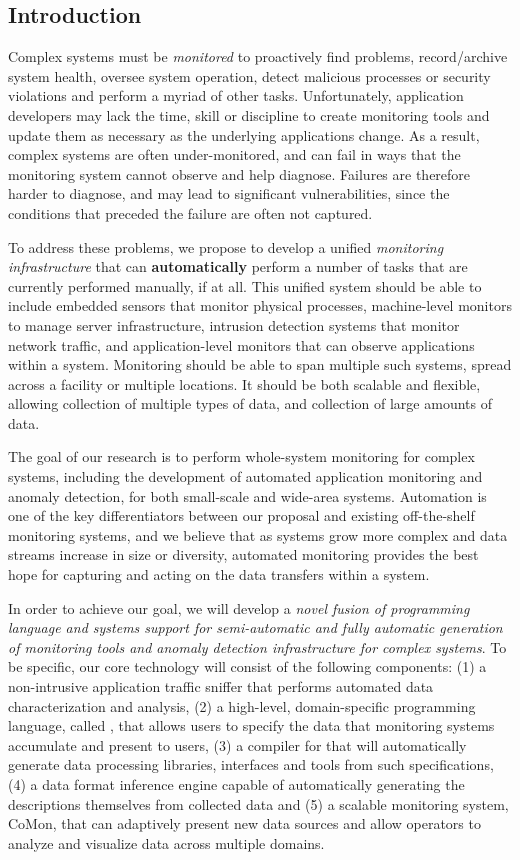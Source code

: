 \subsection{Introduction}
\label{ssec:intro}

Complex systems must be {\em monitored} to proactively find problems,
record/archive system health, oversee system operation, detect
malicious processes or security violations and perform a myriad of
other tasks.  Unfortunately, application developers may lack the time, skill
or discipline to create monitoring tools and update them as necessary
as the underlying applications change. As a result, complex systems
are often under-monitored, and can fail in ways that the monitoring
system cannot observe and help diagnose. Failures are therefore harder
to diagnose, and may lead to significant vulnerabilities, since the 
conditions that preceded the failure are often not captured.

To address these problems, we propose to develop a unified {\em
monitoring infrastructure} that can {\bf automatically} perform a
number of tasks that are currently performed manually, if at all.
This unified system should be able to include embedded sensors that
monitor physical processes, machine-level monitors to manage server
infrastructure, intrusion detection systems that monitor network
traffic, and application-level monitors that can observe applications
within a system. Monitoring should be able to span multiple such
systems, spread across a facility or multiple locations. It should be
both scalable and flexible, allowing collection of multiple types of
data, and collection of large amounts of data.

The goal of our research is to perform whole-system monitoring for
complex systems, including the development of automated application
monitoring and anomaly detection, for both small-scale and wide-area
systems. Automation is one of the key differentiators between our
proposal and existing off-the-shelf monitoring systems, and we believe
that as systems grow more complex and data streams increase in size or
diversity, automated monitoring provides the best hope for capturing
and acting on the data transfers within a system.

In order to achieve our
goal, we will develop a {\em novel fusion of programming language and
systems support for semi-automatic and fully
automatic generation of monitoring tools and anomaly detection
infrastructure for complex systems}.  To be specific, our core technology will consist of
the following components: (1) a non-intrusive application traffic
sniffer that performs automated data characterization and analysis,
(2) a high-level, domain-specific programming language, called
\pads{}, that allows users to specify the data that monitoring systems
accumulate and present to users, (3) a compiler for \pads{} that will
automatically generate data processing libraries, interfaces and tools
from such specifications, (4) a data format inference engine capable
of automatically generating the \pads{} descriptions themselves from
collected data and (5) a scalable monitoring system, CoMon, that can
adaptively present new data sources and allow operators to analyze and
visualize data across multiple domains.

